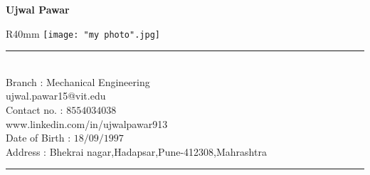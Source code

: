 \documentclass[11pt]{article}
\begin{document}
	
\begin{center}
	\begin{huge}
		\textbf{Ujwal Pawar}\\
	\end{huge}
\end{center}
\bigskip 	
\begin{wrapfigure}{R}{40mm}
	\centering
	\texttt{[image: "my photo".jpg]}
\end{wrapfigure}

\noindent\rule{6.5in}{0.4pt}\\
Branch : Mechanical Engineering\\
ujwal.pawar15@vit.edu\\
Contact no. : $8554034038$ \\      
www.linkedin.com/in/ujwalpawar913\\
Date of Birth : $18/09/1997$ \\
Address : Bhekrai nagar,Hadapsar,Pune-412308,Mahrashtra\\
\noindent\rule{6.5in}{0.4pt}\\
\end{document}
